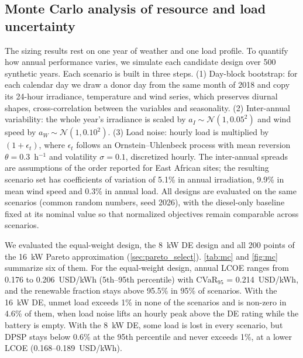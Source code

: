 \documentclass[final,3p,times]{elsarticle}
\begin{document}
\subsection{Monte Carlo analysis of resource and load uncertainty\label{sec:mc}}
The sizing results rest on one year of weather and one load profile. To quantify how annual performance varies, we simulate each candidate design over 500 synthetic years. Each scenario is built in three steps. (1) Day-block bootstrap: for each calendar day we draw a donor day from the same month of 2018 and copy its 24-hour irradiance, temperature and wind series, which preserves diurnal shapes, cross-correlation between the variables and seasonality. (2) Inter-annual variability: the whole year's irradiance is scaled by $a_I \sim \mathcal{N}(1, 0.05^2)$ and wind speed by $a_W \sim \mathcal{N}(1, 0.10^2)$. (3) Load noise: hourly load is multiplied by $(1 + \epsilon_t)$, where $\epsilon_t$ follows an Ornstein--Uhlenbeck process with mean reversion $\theta = 0.3$~h$^{-1}$ and volatility $\sigma = 0.1$, discretized hourly. The inter-annual spreads are assumptions of the order reported for East African sites; the resulting scenario set has coefficients of variation of 5.1\% in annual irradiation, 9.9\% in mean wind speed and 0.3\% in annual load. All designs are evaluated on the same scenarios (common random numbers, seed 2026), with the diesel-only baseline fixed at its nominal value so that normalized objectives remain comparable across scenarios.

We evaluated the equal-weight design, the 8~kW DE design and all 200 points of the 16~kW Pareto approximation (\cref{sec:pareto_select}). \cref{tab:mc} and \cref{fig:mc} summarize six of them. For the equal-weight design, annual LCOE ranges from 0.176 to 0.206~USD/kWh (5th--95th percentile) with CVaR$_{95}$ = 0.214~USD/kWh, and the renewable fraction stays above 95.5\% in 95\% of scenarios. With the 16~kW DE, unmet load exceeds 1\% in none of the scenarios and is non-zero in 4.6\% of them, when load noise lifts an hourly peak above the DE rating while the battery is empty. With the 8~kW DE, some load is lost in every scenario, but DPSP stays below 0.6\% at the 95th percentile and never exceeds 1\%, at a lower LCOE (0.168--0.189~USD/kWh).
\end{document}
